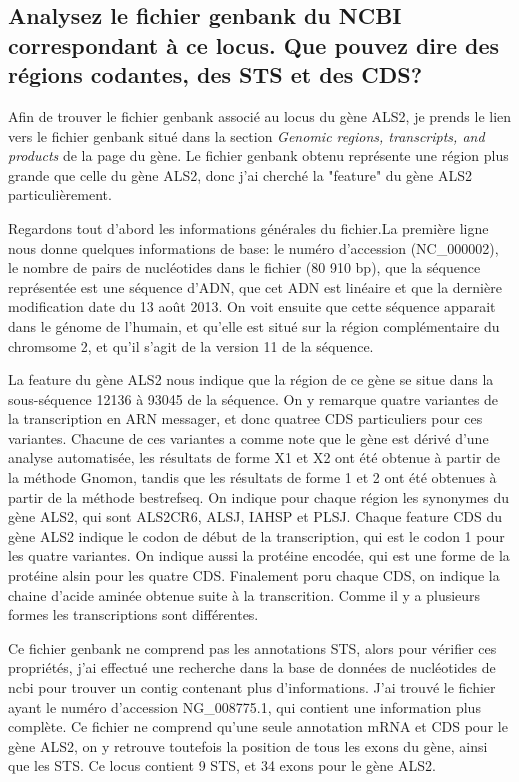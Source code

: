 \documentclass[10.8pt]{article} %
\begin{document}
\subsection[Fichier genbank du gène ALS2]{Analysez le fichier genbank du NCBI correspondant à ce locus. Que pouvez dire des
régions codantes, des STS et des CDS?}

Afin de trouver le fichier genbank associé au locus du gène ALS2, je prends le lien vers le fichier genbank situé dans la section
\emph{Genomic regions, transcripts, and products} de la page du gène. Le fichier genbank obtenu représente une région plus
grande que celle du gène ALS2, donc j'ai cherché la "feature" du gène ALS2 particulièrement.

Regardons tout d'abord les informations générales du fichier.La première ligne nous donne quelques informations de base: le numéro
d'accession (NC\_000002), le nombre de pairs de nucléotides dans le fichier (80 910 bp), que la séquence représentée est une séquence
d'ADN, que cet ADN est linéaire et que la dernière modification date du 13 août 2013. On voit ensuite que cette séquence apparait 
dans le génome de l'humain, et qu'elle est situé sur la région complémentaire du chromsome 2, et qu'il s'agit de la version 11 de la
séquence.

La feature du gène ALS2 nous indique que la région de ce gène se situe dans la sous-séquence 12136 à  93045 de la séquence. On y 
remarque quatre variantes de la transcription en ARN messager, et donc quatree CDS particuliers pour ces variantes.
Chacune de ces variantes a comme note que le gène est dérivé d'une analyse automatisée, les résultats de forme X1 et X2 ont été
obtenue à partir de la méthode Gnomon, tandis que les résultats de forme 1 et 2 ont été obtenues à partir de la méthode
bestrefseq. On indique pour chaque région les synonymes du gène ALS2, qui sont ALS2CR6, ALSJ, IAHSP et PLSJ. Chaque feature CDS
du gène ALS2 indique le codon de début de la transcription, qui est le codon 1 pour les quatre variantes. On indique aussi la
protéine encodée, qui est une forme de la protéine alsin pour les quatre CDS. Finalement poru chaque CDS, on indique la
chaine d'acide aminée obtenue suite à la transcrition. Comme il y a plusieurs formes les transcriptions sont différentes.

Ce fichier genbank ne comprend pas les annotations STS, alors pour vérifier ces propriétés, j'ai effectué une recherche dans la
base de données de nucléotides de ncbi pour trouver un contig contenant plus d'informations. J'ai trouvé le fichier ayant le
numéro d'accession NG\_008775.1, qui contient une information plus complète. Ce fichier ne comprend qu'une seule annotation mRNA
et CDS pour le gène ALS2, on y retrouve toutefois la position de tous les exons du gène, ainsi que les STS. Ce locus contient
9 STS, et 34 exons pour le gène ALS2. 
\end{document}
